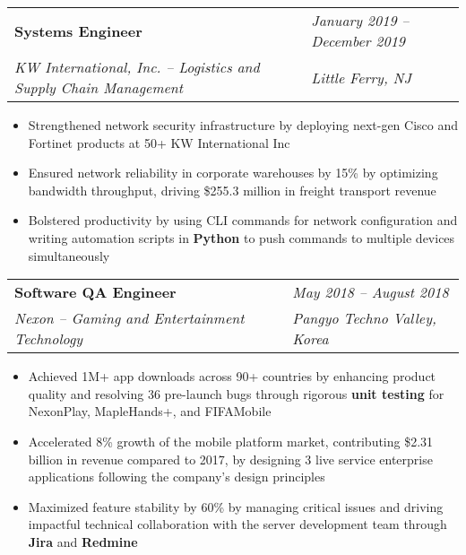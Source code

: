 \documentclass[a4paper,10.5pt]{article}
\begin{document}
\begin{tabular}{@{}p{\dimexpr\linewidth-6cm}@{}p{6cm}@{}}
\textbf{Systems Engineer}& \hfill \textit{January 2019 – December 2019} \\
\vspace{-0.9em} %

\textit{KW International, Inc. – Logistics and Supply Chain Management} & \hfill \textit{Little Ferry, NJ} \\
\end{tabular}
\vspace{-1.3em} %
\begin{itemize}[topsep=0pt, partopsep=0pt, parsep=0pt, itemsep=0pt]
    \item Strengthened network security infrastructure by deploying next-gen Cisco and Fortinet products at 50+ KW International Inc
    \item Ensured network reliability in corporate warehouses by 15\% by optimizing bandwidth throughput, driving \$255.3 million in freight transport revenue
    \item Bolstered productivity by using CLI commands for network configuration and writing automation scripts in \textbf{Python} to push commands to multiple devices simultaneously
\end{itemize}
\vspace{-0.3em} %

\begin{tabular}{@{}p{\dimexpr\linewidth-5cm}@{}p{5cm}@{}}
\textbf{Software QA Engineer}& \hfill \textit{May 2018 – August 2018} \\
\vspace{-0.9em} %

\textit{Nexon – Gaming and Entertainment Technology} & \hfill \textit{Pangyo Techno Valley, Korea} \\
\end{tabular}
\vspace{-1.3em} %
\begin{itemize}[topsep=0pt, partopsep=0pt, parsep=0pt, itemsep=0pt]
    \item Achieved 1M+ app downloads across 90+ countries by enhancing product quality and resolving 36 pre-launch bugs through rigorous \textbf{unit testing} for NexonPlay, MapleHands+, and FIFAMobile
    \item Accelerated 8\% growth of the mobile platform market, contributing \$2.31 billion in revenue compared to 2017, by designing 3 live service enterprise applications following the company’s design principles
\item Maximized feature stability by 60\% by managing critical issues and driving impactful technical collaboration with the server development team through \textbf{Jira} and \textbf{Redmine}
\end{itemize}
\vspace{-0.3em} %
\end{document}
